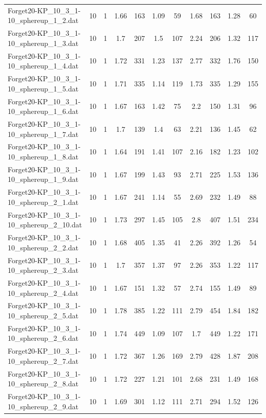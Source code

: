 \begin{table}[!ht]
\begin{tabular}{lcccccccccc}
Forget20-KP\_10\_3\_1-10\_sphereup\_1\_2.dat & 10 & 1 & 1.66 & 163 & 1.09 & 59 & 1.68 & 163 & 1.28 & 60 \\
Forget20-KP\_10\_3\_1-10\_sphereup\_1\_3.dat & 10 & 1 & 1.7 & 207 & 1.5 & 107 & 2.24 & 206 & 1.32 & 117 \\
Forget20-KP\_10\_3\_1-10\_sphereup\_1\_4.dat & 10 & 1 & 1.72 & 331 & 1.23 & 137 & 2.77 & 332 & 1.76 & 150 \\
Forget20-KP\_10\_3\_1-10\_sphereup\_1\_5.dat & 10 & 1 & 1.71 & 335 & 1.14 & 119 & 1.73 & 335 & 1.29 & 155 \\
Forget20-KP\_10\_3\_1-10\_sphereup\_1\_6.dat & 10 & 1 & 1.67 & 163 & 1.42 & 75 & 2.2 & 150 & 1.31 & 96 \\
Forget20-KP\_10\_3\_1-10\_sphereup\_1\_7.dat & 10 & 1 & 1.7 & 139 & 1.4 & 63 & 2.21 & 136 & 1.45 & 62 \\
Forget20-KP\_10\_3\_1-10\_sphereup\_1\_8.dat & 10 & 1 & 1.64 & 191 & 1.41 & 107 & 2.16 & 182 & 1.23 & 102 \\
Forget20-KP\_10\_3\_1-10\_sphereup\_1\_9.dat & 10 & 1 & 1.67 & 199 & 1.43 & 93 & 2.71 & 225 & 1.53 & 136 \\
Forget20-KP\_10\_3\_1-10\_sphereup\_2\_1.dat & 10 & 1 & 1.67 & 241 & 1.14 & 55 & 2.69 & 232 & 1.49 & 88 \\
Forget20-KP\_10\_3\_1-10\_sphereup\_2\_10.dat & 10 & 1 & 1.73 & 297 & 1.45 & 105 & 2.8 & 407 & 1.51 & 234 \\
Forget20-KP\_10\_3\_1-10\_sphereup\_2\_2.dat & 10 & 1 & 1.68 & 405 & 1.35 & 41 & 2.26 & 392 & 1.26 & 54 \\
Forget20-KP\_10\_3\_1-10\_sphereup\_2\_3.dat & 10 & 1 & 1.7 & 357 & 1.37 & 97 & 2.26 & 353 & 1.22 & 117 \\
Forget20-KP\_10\_3\_1-10\_sphereup\_2\_4.dat & 10 & 1 & 1.67 & 151 & 1.32 & 57 & 2.74 & 155 & 1.49 & 89 \\
Forget20-KP\_10\_3\_1-10\_sphereup\_2\_5.dat & 10 & 1 & 1.78 & 385 & 1.22 & 111 & 2.79 & 454 & 1.84 & 182 \\
Forget20-KP\_10\_3\_1-10\_sphereup\_2\_6.dat & 10 & 1 & 1.74 & 449 & 1.09 & 107 & 1.7 & 449 & 1.22 & 171 \\
Forget20-KP\_10\_3\_1-10\_sphereup\_2\_7.dat & 10 & 1 & 1.72 & 367 & 1.26 & 169 & 2.79 & 428 & 1.87 & 208 \\
Forget20-KP\_10\_3\_1-10\_sphereup\_2\_8.dat & 10 & 1 & 1.72 & 227 & 1.21 & 101 & 2.68 & 231 & 1.49 & 168 \\
Forget20-KP\_10\_3\_1-10\_sphereup\_2\_9.dat & 10 & 1 & 1.69 & 301 & 1.12 & 111 & 2.71 & 294 & 1.52 & 126 \\

\end{tabular}
\end{table}
